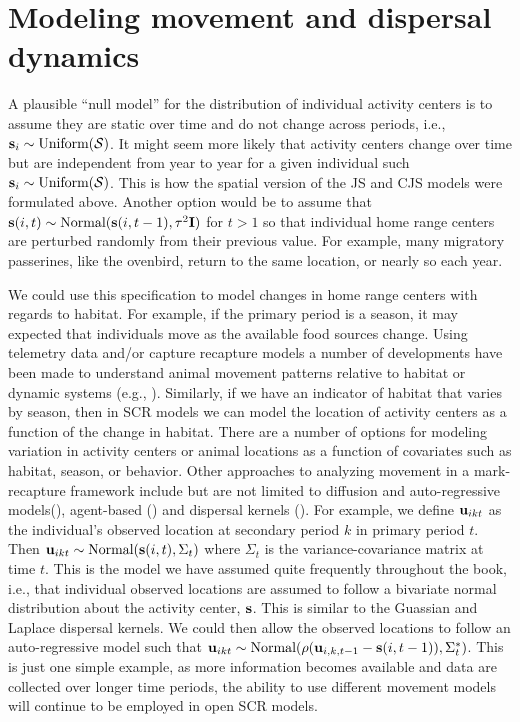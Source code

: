 \section{Modeling movement and dispersal dynamics}
\label{open.sec.ACdyanmics}

A plausible ``null model'' for the
distribution of individual activity centers is to assume they are
static over time and do not change across periods,
i.e., ${\bf s}_{i} \sim \mbox{Uniform}({\cal S})$.  It might seem more likely
that activity centers change over time but are independent from year to year for a
given individual such ${\bf s}_{i} \sim \mbox{Uniform}({\cal S})$.  This is how
the spatial version of the JS and CJS models were formulated above.
Another option would be to assume that ${\bf s}(i,t) \sim \mbox{Normal}({\bf
  s}(i,t-1), \tau^{2} {\bf I})$ for $t > 1$ so that individual home range
centers are perturbed randomly from their previous value. For
example, many migratory passerines, like the ovenbird, return to the
same location, or nearly so each year.


We could use this specification to model changes in home range centers
with regards to habitat.  For example, if the primary period is a
season, it may expected that individuals move as the available food
sources change. Using telemetry data and/or capture recapture models a
number of developments have been made to understand animal movement
patterns relative to habitat or dynamic systems (e.g.,
\cite{jonsen_etal:2005, hooten_wikle:2010}).  Similarly, if we have an
indicator of habitat that varies by season, then in SCR models we can
model the location of activity centers as a function of the change in
habitat.  There are a number of options for modeling variation in
activity centers or animal locations as a function of covariates such
as habitat, season, or behavior.  Other approaches to analyzing
movement in a mark-recapture framework include but are not limited to
diffusion and auto-regressive models(\cite{ovaskainen:2004,
  ovaskainen_etal:2008}), agent-based (\cite{grimm_etal:2005,
  hooten_etal:2010}) and dispersal kernels
(\cite{fujiwara_etal:2006}).  For example, we define ${\bf u}_{ikt}$ as the
individual's observed location at secondary period $k$ in primary
period $t$.
Then ${\bf u}_{ikt} \sim \mbox{Normal}({\bf s}(i,t), \Sigma_t)$ where
$\Sigma_t$ is the variance-covariance matrix at time $t$.  This is the
model we have assumed quite frequently throughout the book, i.e., that
individual observed locations are assumed to follow a bivariate normal
distribution about the activity center, ${\bf s}$. This is similar to
the Guassian and Laplace dispersal kernels.  We could then allow the
observed locations to follow an auto-regressive model such that ${\bf
  u}_{ikt} \sim \mbox{Normal}(\rho ({\bf u}_{i,k,t-1} - {\bf
  s}(i,t-1)), \Sigma^{*}_t)$.  This is just one simple example, as
more information becomes available and data are collected over longer
time periods, the ability to use different movement models will
continue to be employed in open SCR models.

